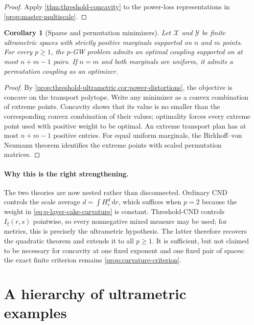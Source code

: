 \documentclass[11pt,a4paper]{article}
\newtheorem{corollary}[theorem]{Corollary}
\theoremstyle{definition}
\theoremstyle{remark}
\newcommand{\dd}{\,\mathrm d}
\begin{document}
\begin{proof}
Apply \cref{thm:threshold-concavity} to the power-loss representations in
\cref{prop:master-multiscale}.
\end{proof}

\begin{corollary}[Sparse and permutation minimizers]
\label{cor:ultrametric-extreme-minimizer}
Let \(\mathcal X\) and \(\mathcal Y\) be finite ultrametric spaces with
strictly positive marginals supported on \(n\) and \(m\) points.  For every
\(p\geq1\), the \(p\)-GW problem admits an optimal coupling supported on at
most \(n+m-1\) pairs.  If \(n=m\) and both marginals are uniform, it admits a
permutation coupling as an optimizer.
\end{corollary}

\begin{proof}
By \cref{prop:threshold-ultrametric,cor:power-distortions}, the objective is
concave on the transport polytope.  Write any minimizer as a convex combination
of extreme points.  Concavity shows that its value is no smaller than the
corresponding convex combination of their values; optimality forces every
extreme point used with positive weight to be optimal.  An extreme transport
plan has at most \(n+m-1\) positive entries.  For equal uniform marginals, the
Birkhoff--von Neumann theorem identifies the extreme points with scaled
permutation matrices.
\end{proof}

\paragraph{Why this is the right strengthening.}
The two theories are now nested rather than disconnected.  Ordinary CND
controls the scale average
\(d=\int H_r^d\dd r\), which suffices when \(p=2\) because the weight in
\eqref{eq:p-layer-cake-curvature} is constant.  Threshold-CND controls
\(I_\xi(r,s)\) pointwise, so every nonnegative mixed measure may be used; for
metrics, this is precisely the ultrametric hypothesis.  The latter therefore
recovers the quadratic theorem and extends it to all \(p\geq1\).  It is
sufficient, but not claimed to be necessary for concavity at one fixed
exponent and one fixed pair of spaces: the exact finite criterion remains
\cref{prop:curvature-criterion}.

\section{A hierarchy of ultrametric examples}
\label{sec:ultrametric-examples}
\end{document}
